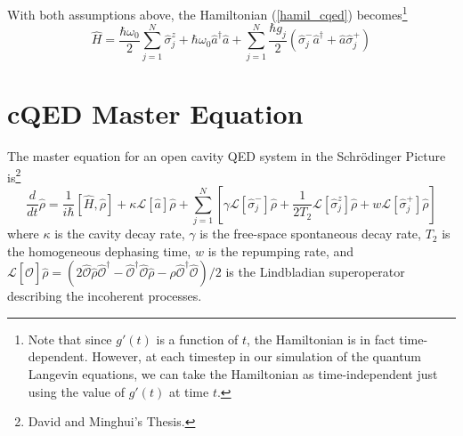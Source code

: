 \documentclass{article}
\newcommand{\lindblad}{\mathcal{L}}
\newcommand{\ope}{\hat{\mathcal{O}}}
\newcommand{\szj}{\hat{\sigma}^z_j}
\newcommand{\spj}{\hat{\sigma}^+_j}
\newcommand{\smj}{\hat{\sigma}^-_j}
\begin{document}
With both assumptions above, the Hamiltonian (\ref{hamil_cqed}) becomes\footnote{Note that since $g'(t)$ is a function of $t$, the Hamiltonian is in fact time-dependent. However, at each timestep in our simulation of the quantum Langevin equations, we can take the Hamiltonian as time-independent just using the value of $g'(t)$ at time $t$.} 
\begin{equation}
\label{hamil_beamLaser}
    \hat{H} = \frac{\hbar \omega_0}{2}\sum^{N}_{j=1}\szj+\hbar \omega_0 \hat{a}^\dagger \hat{a}+\sum^{N}_{j=1}\frac{\hbar g_j}{2}\left(\smj \hat{a}^\dagger+\hat{a}\spj\right)
\end{equation}







\section{cQED Master Equation}
The master equation for an open cavity QED system in the Schrödinger Picture is\footnote{David and Minghui's Thesis.}
\begin{equation}
\label{master_cqed}
\frac{d}{dt}\hat{\rho}=\frac{1}{i\hbar}\left[\hat{H},\hat{\rho}\right]+\kappa\lindblad[\hat{a}]\hat{\rho}+\sum^{N}_{j=1}\left[\gamma \lindblad[\hat{\sigma}^{-}_j]\hat{\rho}+\frac{1}{2T_2}\lindblad[\hat{\sigma}^{z}_j]\hat{\rho}+w\lindblad[\hat{\sigma}^{+}_j ]\hat{\rho}\right]
\end{equation}
where $\kappa$ is the cavity decay rate, $\gamma$ is the free-space spontaneous decay rate, $T_2$ is the homogeneous dephasing time, $w$ is the repumping rate, and $\lindblad[\ope]\hat{\rho} = (2\ope\hat{\rho}\ope^\dagger-\ope^\dagger\ope\hat{\rho}-\rho\ope^\dagger\ope)/2$ is the Lindbladian superoperator describing the incoherent processes.
\end{document}
